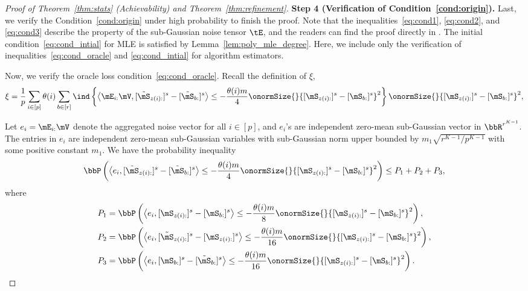\documentclass[lettersize,onecolumn,journal]{IEEEtran}
\theoremstyle{definition}
\theoremstyle{definition}
\newcommand{\of}[1]{\left(#1\right)}
\newcommand{\offf}[1]{\left\{#1\right\}}
\newcommand{\ang}[1]{\left\langle#1\right\rangle}
\begin{document}
\begin{proof}[Proof of Theorem~\ref{thm:stats} (Achievability) and Theorem~\ref{thm:refinement}]
   
    
    {\bf Step 4 (Verification of Condition~\ref{cond:origin}).} Last, we verify the Condition~\ref{cond:origin} under high probability to finish the proof. Note that the inequalities~\eqref{eq:cond1}, \eqref{eq:cond2}, and \eqref{eq:cond3} describe the property of the sub-Gaussian noise tensor $\tE$, and the readers can find the proof directly in \citet[Step 5, Proof of Theorem 2]{han2020exact}. The initial condition~\eqref{eq:cond_intial} for MLE is satisfied by Lemma~\ref{lem:poly_mle_degree}. Here, we include only the verification of inequalities~\eqref{eq:cond_oracle} and \eqref{eq:cond_intial} for algorithm estimators. 
    
    Now, we verify the oracle loss condition~\eqref{eq:cond_oracle}. Recall the definition of $\xi$,
    \begin{align}
        \xi = \frac{1}{p} \sum_{i \in [p]} \theta(i) \sum_{b \in [r]} \ind \offf{  \ang{ \mE_{i:} \mV, [  \tilde \mS_{z(i):} ]^s - [  \tilde \mS_{b:} ]^s }  \leq - \frac{\theta(i) m}{4} \onormSize{}{ [ \mS_{z(i):}  ]^s - [ \mS_{b:}  ]^s  }^2 } \onormSize{}{ [ \mS_{z(i):}  ]^s - [ \mS_{ b:}  ]^s  }^2,
    \end{align}

    Let $e_i = \mE_{i:} \mV$ denote the aggregated noise vector for all $i \in [p]$, and $e_i$'s are independent zero-mean sub-Gaussian vector in $\bbR^{r^{K-1}}$. The entries in $e_i$ are independent zero-mean sub-Gaussian variables with sub-Gaussian norm upper bounded by $m_1\sqrt{r^{K-1}/p^{K-1}}$ with some positive constant $m_1$. We have the probability inequality
    \begin{align}
        \bbP \of{ \ang{ e_i, [  \tilde \mS_{z(i):} ]^s - [  \tilde \mS_{b:} ]^s }  \leq - \frac{ \theta(i) m}{4} \onormSize{}{ [ \mS_{z(i):}  ]^s - [ \mS_{b:}  ]^s  }^2} \leq P_1 + P_2 + P_3,
    \end{align}
    where 
    \begin{align}
        P_1 &= \bbP \of{ \ang{e_i, [  \mS_{z(i):} ]^s - [ \mS_{b:} ]^s} \leq -\frac{\theta(i)m}{8}  \onormSize{}{ [ \mS_{z(i):}  ]^s - [ \mS_{b:}  ]^s  }^2 }, \\
        P_2 &= \bbP \of{ \ang{e_i, [ \tilde  \mS_{z(i):} ]^s - [ \mS_{z(i):} ]^s} \leq -\frac{\theta(i)m}{16}  \onormSize{}{ [ \mS_{z(i):}  ]^s - [ \mS_{b:}  ]^s  }^2 },\\
        P_3 &= \bbP \of{ \ang{e_i, [  \mS_{b:} ]^s - [\tilde  \mS_{b:} ]^s} \leq -\frac{\theta(i)m}{16}   \onormSize{}{ [ \mS_{z(i):}  ]^s - [ \mS_{b:}  ]^s  }^2 }.
    \end{align}
    

\end{proof}
\end{document}
